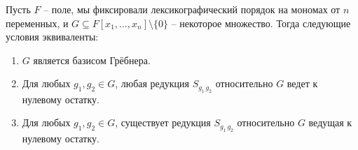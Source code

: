 \begin{claim}
\label{claim::BuchbergerCrit}
Пусть $F$ -- поле, мы фиксировали лексикографический порядок на мономах от $n$ переменных, и $G\subseteq F[x_1,\ldots,x_n]\setminus\{0\}$ -- некоторое множество.
Тогда следующие условия эквиваленты:
\begin{enumerate}
\item $G$ является базисом Грёбнера.

\item Для любых $g_1,g_2\in G$, любая редукция $S_{g_1\,g_2}$ относительно $G$ ведет к нулевому остатку.

\item Для любых $g_1,g_2\in G$, существует редукция $S_{g_1\,g_2}$ относительно $G$ ведущая к нулевому остатку.
\end{enumerate}
\end{claim}
